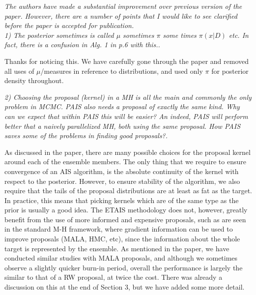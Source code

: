 \documentclass{article}
\newcommand{\comment}[2]{\vspace{0.6cm}{\bf Comment:} {\it #1.}

\vspace{0.3cm}{\bf Answer:} #2}
\begin{document}
\comment{The authors have made a substantial improvement over previous version of the paper. However, there are a number of points that I would like to see clarified before the paper is accepted for publication.\\
1) The posterior sometimes is called $\mu$ sometimes $\pi$ some times $\pi(x|D)$ etc. In fact, there is a confusion in Alg. 1 in p.6 with this.}{Thanks for noticing this. We have carefully gone through the paper and removed all uses of $\mu$/measures in reference to distributions, and used only $\pi$ for posterior density throughout.}

\comment{2) Choosing the proposal (kernel) in a MH is all the main and commonly the only problem in MCMC. PAIS also needs a proposal of exactly the same kind. Why can we expect that within PAIS this will be easier? An indeed, PAIS will perform better that a naively parallelized MH, both using the same proposal. How PAIS saves some of the problems in finding good proposals?}{As discussed in the paper, there are many possible choices for the proposal kernel around each of the ensemble members. The only thing that we require to ensure convergence of an AIS algorithm, is the absolute continuity of the kernel with respect to the posterior. However, to ensure stability of the algorithm, we also require that the tails of the proposal distributions are at least as fat as the target. In practice, this means that picking kernels which are of the same type as the prior is usually a good idea. The ETAIS methodology does not, however, greatly benefit from the use of more informed and expensive proposals, such as are seen in the standard M-H framework, where gradient information can be used to improve proposals (MALA, HMC, etc), since the information about the whole target is represented by the ensemble. As mentioned in the paper, we have conducted similar studies with MALA proposals, and although we sometimes observe a slightly quicker burn-in period, overall the performance is largely the similar to that of a RW proposal, at twice the cost. There was already a discussion on this at the end of Section 3, but we have added some more detail.}
\end{document}
